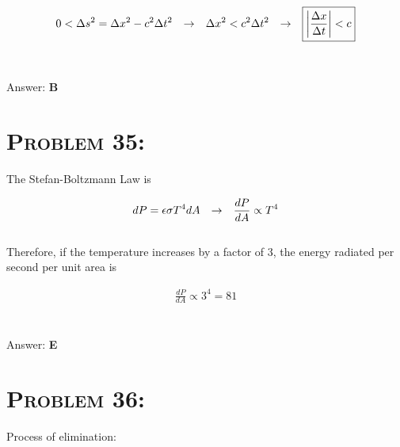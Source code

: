\documentclass{article}
\begin{document}
\begin{align}
 0 < \Delta s^{2}   =  \Delta x^{2} - c^{2} \Delta t^{2} \hspace{.1in} \rightarrow \hspace{.1in}
 \Delta x^{2} <  c^{2} \Delta t^{2} \hspace{.1in} \rightarrow \hspace{.1in}
 \boxed{\left|   \frac{\Delta x}{\Delta t} \right| < c}\nonumber
\end{align}
\\\\
Answer: \textbf{\textcolor{ProcessBlue}B}\\


\section{\textsc{Problem 35:}} The Stefan-Boltzmann Law is

\begin{gather}
dP = \epsilon \sigma T^{4} dA \hspace{.1in} \rightarrow \hspace{.1in} \frac{dP}{dA} \propto T^{4}
\end{gather}
\\
Therefore, if the temperature increases by a factor of 3, the energy radiated per second per unit area is

\begin{gather}
\frac{dP}{dA} \propto \boxed{3^{4} = 81}\nonumber
\end{gather}
\\\\
Answer: \textbf{\textcolor{ProcessBlue}E}\\


\section{\textsc{Problem 36:}} Process of elimination:
\end{document}
